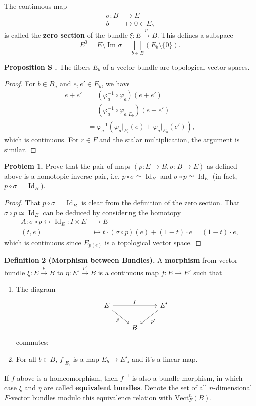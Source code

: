 \documentclass[10pt]{article}
\newcounter{counter}
\newcommand{\counter}{\refstepcounter{counter}{\thecounter} }
\begin{document}
The continuous map \begin{align*}\sigma:B&\to E\\b&\mapsto 0\in E_b\end{align*} is called the \textbf{zero section} of the bundle $\xi:E\overset{p}{\to}B$. This defines a subspace $$E^0=E\setminus\operatorname{Im}\sigma=\bigsqcup_{b\in B}(E_b\setminus\{0\}).$$

\colorbox{red!30}{\textbf{Proposition S\counter.}} The fibers $E_b$ of a vector bundle are topological vector spaces.
\begin{proof}
For $b\in B_a$ and $e,e'\in E_b$, we have \begin{align*}e+e'&=(\varphi_a^{-1}\circ\varphi_a)(e+e')\\&=(\varphi_a^{-1}\circ\varphi_a\big|_{E_b})(e+e')\\&=\varphi_a^{-1}(\varphi_a\big|_{E_b}(e)+\varphi_a\big|_{E_b}(e')),\end{align*} which is continuous. For $r\in F$ and the scalar multiplication, the argument is similar.
\end{proof}

\colorbox{blue!30}{\textbf{Problem 1.}} Prove that the pair of maps $(p:E\to B,\sigma:B\to E)$ as defined above is a homotopic inverse pair, i.e. $p\circ\sigma\simeq\operatorname{Id}_B$ and $\sigma\circ p\simeq\operatorname{Id}_E$ (in fact, $p\circ\sigma=\operatorname{Id}_B$).
\begin{proof}
That $p\circ\sigma=\operatorname{Id}_B$ is clear from the definition of the zero section. That $\sigma\circ p\simeq\operatorname{Id}_E$ can be deduced by considering the homotopy \begin{align*}A:\sigma\circ p\leftrightarrow\operatorname{Id}_E:I\times E&\to E\\(t,e)&\mapsto t\cdot(\sigma\circ p)(e)+(1-t)\cdot e=(1-t)\cdot e,\end{align*} which is continuous since $E_{p(e)}$ is a topological vector space.
\end{proof}

\colorbox{red!30}{\textbf{Definition 2 (Morphism between Bundles).}} A \textbf{morphism} from vector bundle $\xi:E\overset{p}{\to}B$ to $\eta:E'\overset{p'}{\to}B$ is a continuous map $f:E\to E'$ such that \begin{enumerate}\item The diagram
$$\begin{tikzcd}
E \arrow[rd, "p"'] \arrow[rr, "f"] &   & E' \arrow[ld, "p'"] \\
                                   & B &
\end{tikzcd}$$
commutes;
\item For all $b\in B$, $f\big|_{E_b}$ is a map $E_b\to E'_{b}$ and it's a linear map.
\end{enumerate}
If $f$ above is a homeomorphism, then $f^{-1}$ is also a bundle morphism, in which case $\xi$ and $\eta$ are called \textbf{equivalent bundles}. Denote the set of all $n$-dimensional $F$-vector bundles modulo this equivalence relation with $\mathrm{Vect}_F^n(B)$.
\end{document}
